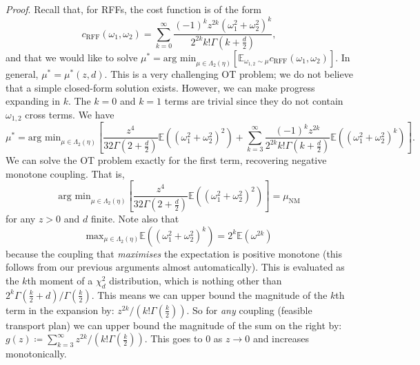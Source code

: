 \emph{Proof}. Recall that, for RFFs, the cost function is of the form
\begin{equation}
    c_\textrm{RFF}(\omega_1, \omega_2) = \sum_{k=0}^\infty \frac{(-1)^k z^{2k} \left( \omega_1^2 + \omega_2^2 \right)^k}{2^{2k} k! \Gamma(k+\frac{d}{2})},
\end{equation}
and that we would like to solve $
    \mu^* = \textrm{arg min}_{\mu \in \Lambda_2(\eta)} \left [ \mathbb{E}_{{{\omega}_{1,2}} \sim \mu } c_
    \textrm{RFF}(\omega_1, \omega_2) \right].$
In general, $\mu^* = \mu^*(z,d)$.
This is a very challenging OT problem; we do not believe that a simple closed-form solution exists. 
However, we can make progress expanding in $k$.
The $k=0$ and $k=1$ terms are trivial since they do not contain $\omega_{1,2}$ cross terms.
We have
\begin{equation}
    \mu^* = \textrm{arg min}_{\mu \in \Lambda_2(\eta)} \left [ \frac{z^4}{32 \Gamma(2 + \frac{d}{2})} \mathbb{E}\left((\omega_1^2 + \omega_2^2)^2\right) + \sum_{k=3}^\infty \frac{(-1)^k z^{2k}}{2^{2k} k! \Gamma(k+\frac{d}{2})} \mathbb{E} \left( \left( \omega_1^2 + \omega_2^2 \right)^k \right) \right].
\end{equation}
We can solve the OT problem exactly for the first term, recovering negative monotone coupling. 
That is,
\begin{equation}
    \textrm{arg min}_{\mu \in \Lambda_2(\eta)} \left [ \frac{z^4}{32 \Gamma(2 + \frac{d}{2})} \mathbb{E}\left( (\omega_1^2 + \omega_2^2)^2\right) \right] = \mu_\textrm{NM}
\end{equation}
for any $z>0$ and $d$ finite.
Note also that
\begin{equation}
    \textrm{max}_{\mu \in \Lambda_2(\eta)} \mathbb{E} \left( \left( \omega_1^2 + \omega_2^2 \right)^k \right) = 2^k \mathbb{E} \left( \omega^{2k} \right)
\end{equation}
because the coupling that \emph{maximises} the expectation is positive monotone (this follows from our previous arguments almost automatically).
This is evaluated as the $k$th moment of a $\chi^2_d$ distribution, which is nothing other than $2^k \Gamma(\frac{k}{2} + d)/\Gamma(\frac{k}{2})$. 
This means we can upper bound the magnitude of the $k$th term in the expansion by: $ z^{2k}/ \left (k! \Gamma(\frac{k}{2}) \right)$.
So for \emph{any} coupling (feasible transport plan) we can upper bound the magnitude of the sum on the right by: $g(z) \coloneqq \sum_{k=3}^\infty z^{2k}/ \left (k! \Gamma(\frac{k}{2}) \right)$.
This goes to $0$ as $z\to0$ and increases monotonically.


